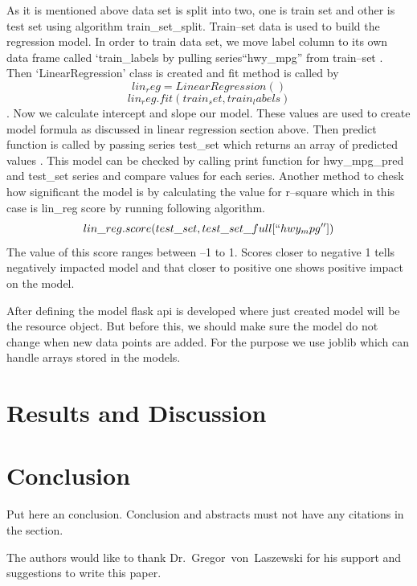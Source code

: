    As it is mentioned above data set is split into two, one is train
   set and other is test set using algorithm train\_set\_split. 
   Train--set data is used to build the regression
   model. In order to train data set, we move label column to its own data frame
   called `train\_labels by pulling  series``hwy\_mpg'' from 
   train--set \cite{regression}. Then `LinearRegression' class is created and fit 
   method is called by \[lin_reg = LinearRegression()\] 
   \[lin_reg.fit(train_set, train_labels)\]. Now we calculate intercept and
  slope our model. These values are used to create model formula
  as discussed in linear regression section above. Then predict function is
  called  by passing series test\_set which returns an array of predicted 
  values \cite{regression}. This model can be checked by calling print function
  for hwy\_mpg\_pred
  and test\_set series and compare values for each series. Another method to
  chesk how significant the model is by calculating the value for r--square 
  which in this case is lin\_reg score by running following algorithm.  
  \[lin\_reg.score(test\_set, test\_set\_full[``hwy_mpg''])\]
  The value of this score ranges between --1 to 1. Scores closer to negative 1
  tells negatively impacted model and that closer to positive one shows positive 
  impact on the model.
  
  After defining the model flask api is developed where just created model will 
  be the resource object. But before this, we should make sure the model do not 
  change when new data points are added. For the purpose we use joblib which can
  handle arrays stored in the models.
  
   
  
\section{Results and Discussion}


  
\section{Conclusion}

Put here an conclusion. Conclusion and abstracts must not have any
citations in the section.


\begin{acks}

  The authors would like to thank Dr.~Gregor~von~Laszewski for his
  support and suggestions to write this paper.

\end{acks}

